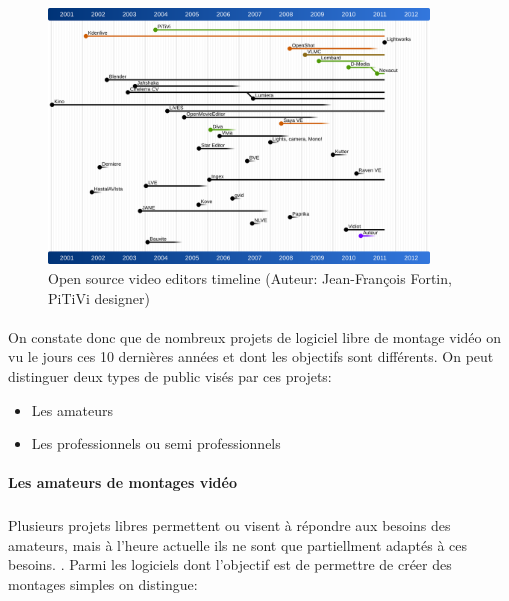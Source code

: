 \begin{figure} [h]
  \begin{center}
    \includegraphics[width=0.9\textwidth]{images/open-source-video-editor-timeline}
  \end{center} \caption{Open source video editors timeline (Auteur:
  Jean-François Fortin, PiTiVi designer)} \label{Yes}
\end{figure}

\paragraph{ }

On constate donc que de nombreux projets de logiciel libre de montage
vidéo on vu le jours ces 10 dernières années et dont les objectifs
sont différents.  On peut distinguer deux types de public visés par
ces projets:

\begin {itemize}

  \item {Les amateurs}

  \item {Les professionnels ou semi professionnels}
\end {itemize}

\paragraph {Les amateurs de montages vidéo}

\subparagraph{}

Plusieurs projets libres permettent ou visent à répondre aux besoins
des amateurs, mais à l'heure actuelle ils ne sont que partiellment
adaptés à ces besoins.  . Parmi les logiciels dont l'objectif est de
permettre de créer des montages simples on distingue:


